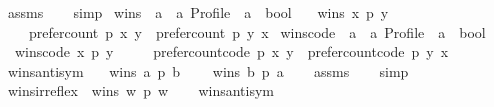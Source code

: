 \begin{isabellebody}
%
\isatagproof
{}\isamarkupfalse%
\ assms\isanewline
\ \ \isamarkupfalse%
\ simp%
\endisatagproof
{\isafoldproof}%
%
\isadelimproof
\isanewline
%
\endisadelimproof
\isanewline
{}\isamarkupfalse%
\ wins\ {\isacharcolon}{\kern0pt}{\isacharcolon}{\kern0pt}\ {\isachardoublequoteopen}{\isacharprime}{\kern0pt}a\ {\isasymRightarrow}\ {\isacharprime}{\kern0pt}a\ Profile\ {\isasymRightarrow}\ {\isacharprime}{\kern0pt}a\ {\isasymRightarrow}\ bool{\isachardoublequoteclose}\ \isanewline
\ \ {\isachardoublequoteopen}wins\ x\ p\ y\ {\isacharequal}{\kern0pt}\isanewline
\ \ \ \ {\isacharparenleft}{\kern0pt}prefer{\isacharunderscore}{\kern0pt}count\ p\ x\ y\ {\isachargreater}{\kern0pt}\ prefer{\isacharunderscore}{\kern0pt}count\ p\ y\ x{\isacharparenright}{\kern0pt}{\isachardoublequoteclose}\isanewline
\isanewline
{}\isamarkupfalse%
\ wins{\isacharunderscore}{\kern0pt}code\ {\isacharcolon}{\kern0pt}{\isacharcolon}{\kern0pt}\ {\isachardoublequoteopen}{\isacharprime}{\kern0pt}a\ {\isasymRightarrow}\ {\isacharprime}{\kern0pt}a\ Profile\ {\isasymRightarrow}\ {\isacharprime}{\kern0pt}a\ {\isasymRightarrow}\ bool{\isachardoublequoteclose}\ \isanewline
\ \ {\isachardoublequoteopen}wins{\isacharunderscore}{\kern0pt}code\ x\ p\ y\ {\isacharequal}{\kern0pt}\isanewline
\ \ \ \ {\isacharparenleft}{\kern0pt}prefer{\isacharunderscore}{\kern0pt}count{\isacharunderscore}{\kern0pt}code\ p\ x\ y\ {\isachargreater}{\kern0pt}\ prefer{\isacharunderscore}{\kern0pt}count{\isacharunderscore}{\kern0pt}code\ p\ y\ x{\isacharparenright}{\kern0pt}{\isachardoublequoteclose}\isanewline
\isanewline
\isanewline
{}\isamarkupfalse%
\ wins{\isacharunderscore}{\kern0pt}antisym{\isacharcolon}{\kern0pt}\isanewline
\ \ \ {\isachardoublequoteopen}wins\ a\ p\ b{\isachardoublequoteclose}\isanewline
\ \ \ {\isachardoublequoteopen}{\isasymnot}\ wins\ b\ p\ a{\isachardoublequoteclose}\isanewline
%
\isadelimproof
\ \ %
\endisadelimproof
%
\isatagproof
{}\isamarkupfalse%
\ assms\isanewline
\ \ \isamarkupfalse%
\ simp%
\endisatagproof
{\isafoldproof}%
%
\isadelimproof
\isanewline
%
\endisadelimproof
\isanewline
{}\isamarkupfalse%
\ wins{\isacharunderscore}{\kern0pt}irreflex{\isacharcolon}{\kern0pt}\ {\isachardoublequoteopen}{\isasymnot}\ wins\ w\ p\ w{\isachardoublequoteclose}\isanewline
%
\isadelimproof
\ \ %
\endisadelimproof
%
\isatagproof
{}\isamarkupfalse%
\ wins{\isacharunderscore}{\kern0pt}antisym\isanewline

\end{isabellebody}
